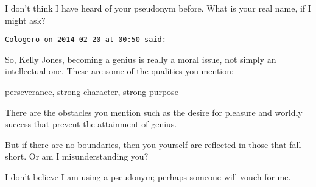 \begin{footnotesize}
\begin{sffamily}
I don't think I have heard of your pseudonym before. What is your real name, if I might ask?


\hfill

\texttt{Cologero on 2014-02-20 at 00:50 said: }

So, Kelly Jones, becoming a genius is really a moral issue, not simply an intellectual one. These are some of the qualities you mention:

perseverance, strong character, strong purpose

There are the obstacles you mention such as the desire for pleasure and worldly success that prevent the attainment of genius.

But if there are no boundaries, then you yourself are reflected in those that fall short. Or am I misunderstanding you?

I don't believe I am using a pseudonym; perhaps someone will vouch for me.


\hfill


\end{sffamily}\end{footnotesize}
